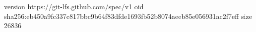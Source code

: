 version https://git-lfs.github.com/spec/v1
oid sha256:eb450a9fc337c817bbc9b64f83dfde1693fb52b8074aeeb85e056931ac2f7eff
size 26836
